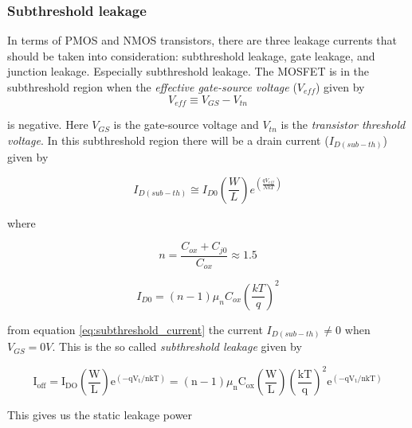 \subsubsection{Subthreshold leakage}
In terms of PMOS and NMOS transistors, there are three leakage currents that should be taken into consideration: subthreshold leakage, gate leakage, and junction leakage. \cite[p. 42]{carusone_2012_analog} Especially subthreshold leakage. The MOSFET is in the subthreshold region when the \textit{effective gate-source voltage} ($V_{eff}$) \cite[p. 17]{carusone_2012_analog} given by
\begin{equation}
    V_{eff}\equiv V_{GS}-V_{tn}
    \label{eq:effective_gate-source_voltage}
\end{equation}

is negative. Here $V_{GS}$ is the gate-source voltage and $V_{tn}$ is the \textit{transistor threshold voltage}. In this subthreshold region there will be a drain current ($I_{D(sub-th)}$) given by

\begin{equation}
    I_{D(sub-th)}\cong I_{D0} \left(\frac{W}{L}\right) e^{(\frac{qV_{eff}}{NkT})}
    \label{eq:subthreshold_current}
\end{equation}

where

\begin{equation}
    n=\frac{C_{ox}+C_{j0}}{C_{ox}}\approx 1.5
    \label{eq:n}
\end{equation}

\begin{equation}
    I_{D0}=(n-1)\mu_nC_{ox}\left(\frac{kT}{q}\right)^2
\end{equation}

from equation \ref{eq:subthreshold_current} the current $I_{D(sub-th)}\neq 0$ when $V_{GS}=0V$. This is the so called \textit{subthreshold leakage} given by 

\begin{equation}
    \mathrm{I}_{\mathrm{off}}=\mathrm{I}_{\mathrm{DO}}\left(\frac{\mathrm{W}}{\mathrm{L}}\right) \mathrm{e}^{\left(-\mathrm{q} \mathrm{V}_{\mathrm{t}} / \mathrm{nkT}\right)}=(\mathrm{n}-1) \mu_{\mathrm{n}} \mathrm{C}_{\mathrm{ox}}\left(\frac{\mathrm{W}}{\mathrm{L}}\right)\left(\frac{\mathrm{kT}}{\mathrm{q}}\right)^2 \mathrm{e}^{\left(-\mathrm{q} \mathrm{V}_{\mathrm{t}} / \mathrm{nkT}\right)}
    \label{eq:subthreshold_leakage}
\end{equation}

This gives us the static leakage power \cite{departmentofelectronicsystemsntnu_2023_dc}

